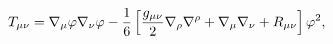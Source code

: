 \begin{equation}
T_{\mu \nu }=\nabla _{\mu }\varphi \nabla _{\nu }\varphi -\frac{1}{6} \left[ \frac{%
g_{\mu \nu }}{2}\nabla _{\rho }\nabla ^{\rho }+\nabla _{\mu
}\nabla _{\nu }+R_{\mu \nu }\right] \varphi ^{2},  \label{EMT1}
\end{equation}

